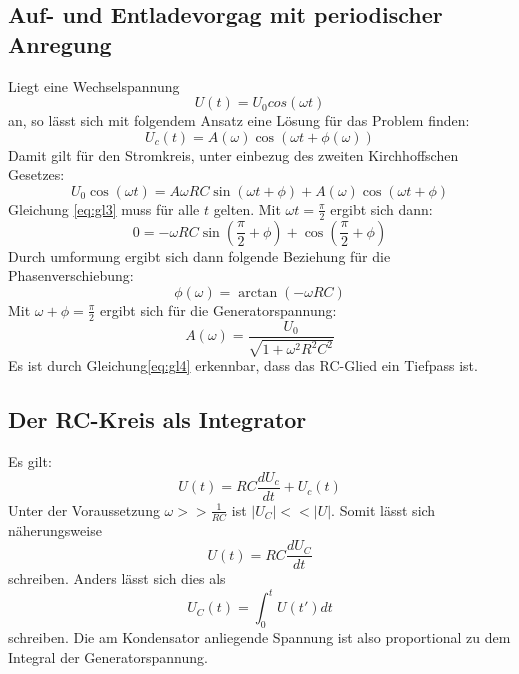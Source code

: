 \subsection{Auf- und Entladevorgag mit periodischer Anregung}
Liegt eine Wechselspannung
\begin{equation}
  U(t)=U_0 cos(\omega t)
\end{equation}
an, so lässt sich mit folgendem Ansatz eine Lösung für das Problem finden:
\begin{equation}
  U_c(t)= A(\omega) \cos{(\omega t + \phi(\omega))}
\end{equation}
Damit gilt für den Stromkreis, unter einbezug des zweiten Kirchhoffschen Gesetzes:
\begin{equation}
  \label{eq:gl3}
  U_0 \cos{(\omega t)} = A \omega R C \sin{(\omega t + \phi)} + A(\omega)\cos{(\omega t + \phi)}
\end{equation}
Gleichung \eqref{eq:gl3} muss für alle $t$ gelten. Mit $\omega t= \frac{\pi}{2}$ ergibt sich dann:
\begin{equation}
  0 = - \omega R C \sin{(\frac{\pi}{2}+\phi)} + \cos{(\frac{\pi}{2}+\phi)}
\end{equation}
Durch umformung ergibt sich dann folgende Beziehung für die Phasenverschiebung:
\begin{equation}
  \phi(\omega)=\arctan{(- \omega R C)}
\end{equation}
Mit $\omega +\phi =\frac{\pi}{2}$ ergibt sich für die Generatorspannung:
\begin{equation}
  \label{eq:gl4}
  A(\omega)= \frac{U_0}{\sqrt{1+\omega^2 R^2 C^2}}
\end{equation}
Es ist durch Gleichung\eqref{eq:gl4} erkennbar, dass das RC-Glied ein Tiefpass ist.

\subsection{Der RC-Kreis als Integrator}
Es gilt:
\begin{equation}
  U(t)= RC \frac{dU_c}{dt} + U_c(t)
\end{equation}
Unter der Voraussetzung $\omega >>\frac{1}{RC}$ ist $|U_C| <<|U|$.
Somit lässt sich näherungsweise
\begin{equation}
  U(t)=RC \frac{dU_C}{dt}
\end{equation}
schreiben.
Anders lässt sich dies als
\begin{equation}
  U_C(t)=\int_0^t U(t') dt
\end{equation}
schreiben.
Die am Kondensator anliegende Spannung ist also proportional zu dem Integral der Generatorspannung.
